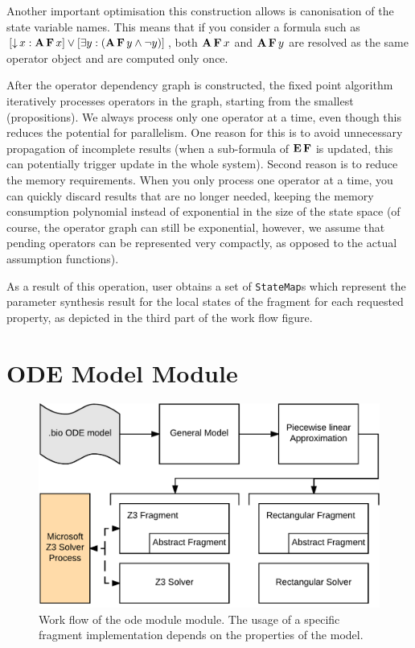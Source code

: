 Another important optimisation this construction allows is canonisation of the state variable names. This means that if you consider a formula such as $[\operatorname{\downarrow} x : \operatorname{\mathbf{A}}\operatorname{\mathbf{F}} x] \lor [\exists y : (\operatorname{\mathbf{A}} \operatorname{\mathbf{F}} y \land \neg y)]$, both $\operatorname{\mathbf{A}}\operatorname{\mathbf{F}} x$ and $\operatorname{\mathbf{A}}\operatorname{\mathbf{F}} y$ are resolved as the same operator object and are computed only once. 

After the operator dependency graph is constructed, the fixed point algorithm iteratively processes operators in the graph, starting from the smallest (propositions). We always process only one operator at a time, even though this reduces the potential for parallelism. One reason for this is to avoid unnecessary propagation of incomplete results (when a sub-formula of $\operatorname{\mathbf{E}}\operatorname{\mathbf{F}}$ is updated, this can potentially trigger update in the whole system). Second reason is to reduce the memory requirements. When you only process one operator at a time, you can quickly discard results that are no longer needed, keeping the memory consumption polynomial instead of exponential in the size of the state space (of course, the operator graph can still be exponential, however, we assume that pending operators can be represented very compactly, as opposed to the actual assumption functions).  

As a result of this operation, user obtains a set of \texttt{StateMap}s which represent the parameter synthesis result for the local states of the fragment for each requested property, as depicted in the third part of the work flow figure.

\section{ODE Model Module}


\begin{figure}[]
	\centering
	\includegraphics[scale=0.45]{media/ode_workflow.pdf}
	\caption{Work flow of the ode module module. The usage of a specific fragment implementation depends on the properties of the model. }
	\label{fig:ode_workflow}
\end{figure}

